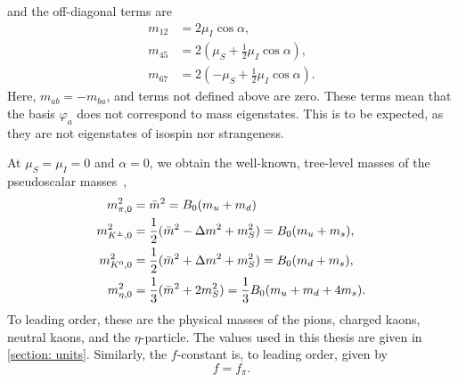 and the off-diagonal terms are
\begin{align}
    \label{m12}
    m_{12} & = 2 \mu_I\cos\alpha,\\
    m_{45} & = 2 \left( \mu_S + \frac{1}{2} \mu_I  \cos\alpha\right), \\
    \label{m76}
    m_{67} & =  2 \left( - \mu_S + \frac{1}{2} \mu_I  \cos\alpha\right).
\end{align}
%
Here, $m_{ab} = -m_{ba}$, and terms not defined above are zero.
These terms mean that the basis $\varphi_a$ does not correspond to mass eigenstates.
This is to be expected, as they are not eigenstates of isospin nor strangeness.

At $\mu_S = \mu_I = 0$ and $\alpha = 0$, we obtain the well-known, tree-level masses of the pseudoscalar masses~\autocite{eckerChiralPerturbationTheory1995},
%
\begin{align}
    \label{leading order pion mass mu=0}
    m_{\pi,0}^2 &
    = \bar m^2 
    = B_0(m_u + m_d)\\
    \label{leading order charged kaon mass mu=0}
    m_{{K^\pm}, 0}^2 
    & = \frac{1}{2} (\bar m^2 - \Delta m^2 + m_S^2) 
    = B_0(m_u + m_s), \\
    \label{leading order neutral kaon mass mu=0}
    m_{{K^0}, 0}^2
    & = \frac{1}{2} (\bar m^2 + \Delta m^2 + m_S^2) 
    = B_0(m_d + m_s), \\
    \label{leading order eta mass mu=0}
    m_{\eta, 0}^2
    &= \frac{1}{3}(\bar m^2  + 2m_S^2) 
    = \frac{1}{3}B_0(m_u + m_d + 4m_s).
\end{align}
%
To leading order, these are the physical masses of the pions, charged kaons, neutral kaons, and the $\eta$-particle.
The values used in this thesis are given in \autoref{section: units}.
Similarly, the $f$-constant is, to leading order, given by
%
\begin{equation}
    f = f_\pi.
\end{equation}


